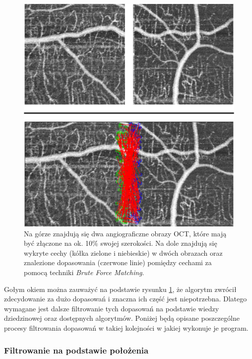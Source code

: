 \begin{figure}[htb]
  \centering
  \includegraphics[width=\textwidth]{gfx/no_filtering}
  \caption{Na górze znajdują się dwa angiograficzne obrazy OCT, które mają być złączone na ok. 10\% swojej szerokości. Na dole znajdują się wykryte cechy (kółka zielone i niebieskie) w dwóch obrazach oraz znalezione dopasowania (czerwone linie) pomiędzy cechami za pomocą techniki \textit{Brute Force Matching}.}
  \label{fig:proponowane_algorytmy:no_filtering}
\end{figure}

Gołym okiem można zauważyć na podstawie rysunku \ref{fig:proponowane_algorytmy:no_filtering}, że algorytm zwrócił zdecydowanie za dużo dopasowań i znaczna ich część jest niepotrzebna. Dlatego wymagane jest dalsze filtrowanie tych dopasowań na podstawie wiedzy dziedzinowej oraz dostępnych algorytmów. Poniżej będą opisane poszczególne procesy filtrowania dopasowań w takiej kolejności w jakiej wykonuje je program.

\subsubsection{Filtrowanie na podstawie położenia}
\label{sec:proponowane_algorytmy:placement_filtering}

